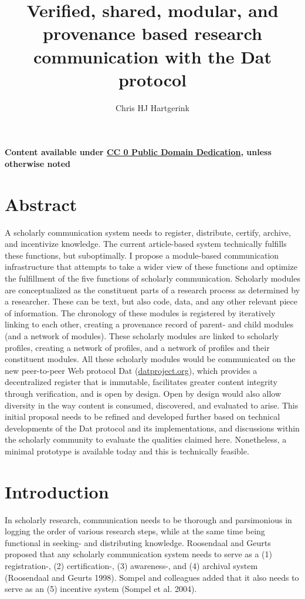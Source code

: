\documentclass[a4paper]{article}
\title{Verified, shared, modular, and provenance based research communication
with the Dat protocol}
\author{Chris HJ Hartgerink}
\date{}
\begin{document}
\maketitle

\textbf{Content available under
\href{https://creativecommons.org/publicdomain/zero/1.0/legalcode}{CC 0
Public Domain Dedication}, unless otherwise noted}

\hypertarget{abstract}{%
\section{Abstract}\label{abstract}}

A scholarly communication system needs to register, distribute, certify,
archive, and incentivize knowledge. The current article-based system
technically fulfills these functions, but suboptimally. I propose a
module-based communication infrastructure that attempts to take a wider
view of these functions and optimize the fulfillment of the five
functions of scholarly communication. Scholarly modules are
conceptualized as the constituent parts of a research process as
determined by a researcher. These can be text, but also code, data, and
any other relevant piece of information. The chronology of these modules
is registered by iteratively linking to each other, creating a
provenance record of parent- and child modules (and a network of
modules). These scholarly modules are linked to scholarly profiles,
creating a network of profiles, and a network of profiles and their
constituent modules. All these scholarly modules would be communicated
on the new peer-to-peer Web protocol Dat
(\href{https://datproject.org}{datproject.org}), which provides a
decentralized register that is immutable, facilitates greater content
integrity through verification, and is open by design. Open by design
would also allow diversity in the way content is consumed, discovered,
and evaluated to arise. This initial proposal needs to be refined and
developed further based on technical developments of the Dat protocol
and its implementations, and discussions within the scholarly community
to evaluate the qualities claimed here. Nonetheless, a minimal prototype
is available today and this is technically feasible.

\hypertarget{introduction}{%
\section{Introduction}\label{introduction}}

In scholarly research, communication needs to be thorough and
parsimonious in logging the order of various research steps, while at
the same time being functional in seeking- and distributing knowledge.
Roosendaal and Geurts proposed that any scholarly communication system
needs to serve as a (1) registration-, (2) certification-, (3)
awareness-, and (4) archival system (Roosendaal and Geurts 1998). Sompel
and colleagues added that it also needs to serve as an (5) incentive
system (Sompel et al. 2004).
\end{document}
